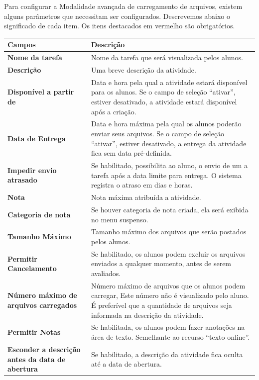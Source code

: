 Para configurar a Modalidade avançada de carregamento de arquivos, existem alguns parâmetros que necessitam ser configurados. Descrevemos abaixo o significado de cada item. Os itens destacados em vermelho são obrigatórios.

\begin{longtable}{p{6cm}|p{9cm}}
     \hline
     \rowcolor[rgb]{0.8,0.8,0.8} \textbf{Campos} &  \textbf{Descrição}\\\hline
	\textbf{Nome da tarefa} & Nome da tarefa que será visualizada pelos alunos. \\\hline
    \textbf{Descrição} &Uma breve descrição da atividade. \\\hline
    \textbf{Disponível a partir de} & Data e hora pela qual a atividade estará disponível para os alunos. Se o campo de seleção “ativar”, estiver desativado, a atividade estará disponível após a criação.\\\hline
    \textbf{Data de Entrega} & Data e hora máxima pela qual os alunos poderão enviar seus arquivos. Se o campo de seleção “ativar”, estiver desativado, a entrega da atividade fica sem data pré-definida. \\\hline
    \textbf{Impedir envio atrasado} & Se habilitado, possibilita ao aluno, o envio de um a tarefa após a data limite para entrega. O sistema registra o atraso em dias e horas.\\\hline
    \textbf{Nota} & Nota máxima atribuída a atividade. \\\hline
    \textbf{Categoria de nota} &  Se houver categoria de nota criada, ela será exibida no menu suspenso.  \\\hline
    \textbf{Tamanho Máximo} & Tamanho máximo dos arquivos que serão postados pelos alunos. \\\hline
    \textbf{Permitir Cancelamento} & Se habilitado, os alunos podem excluir os arquivos enviados a qualquer momento, antes de serem avaliados.\\\hline
    \textbf{Número máximo de arquivos carregados} & Número máximo de arquivos que os alunos podem carregar, Este número não é visualizado pelo aluno. É preferível que a quantidade de arquivos seja informada na descrição da atividade.\\\hline
    \textbf{Permitir Notas} &Se habilitada, os alunos podem fazer anotações na área de texto. Semelhante ao recurso “texto online”.\\\hline
    \textbf{Esconder a descrição antes da data de abertura} & Se habilitado, a descrição da atividade fica oculta até a data de abertura. \\\hline

\end{longtable}
